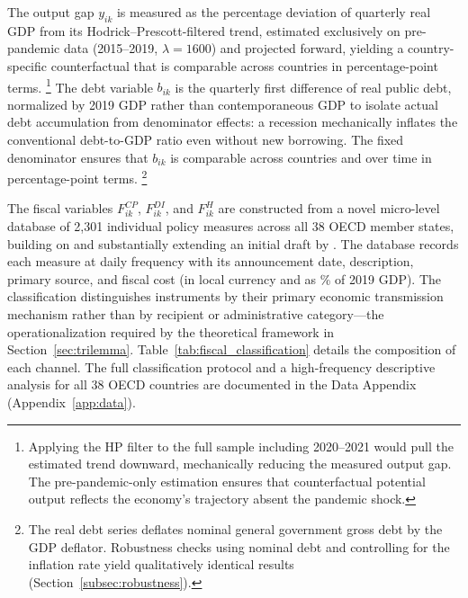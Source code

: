 \documentclass[12pt, a4paper]{article}
\begin{document}
\noindent The output gap $y_{ik}$ is measured as the percentage deviation of
quarterly real GDP from its Hodrick--Prescott-filtered trend, estimated
exclusively on pre-pandemic data (2015--2019, $\lambda = 1600$) and projected
forward, yielding a country-specific counterfactual that is comparable across
countries in percentage-point terms.%
\footnote{Applying the HP filter to the full sample including 2020--2021 would
pull the estimated trend downward, mechanically reducing the measured output gap.
The pre-pandemic-only estimation ensures that counterfactual potential output
reflects the economy's trajectory absent the pandemic shock.}
The debt variable $b_{ik}$ is the quarterly first difference of real public debt,
normalized by 2019 GDP rather than contemporaneous GDP to isolate actual debt
accumulation from denominator effects: a recession mechanically inflates the
conventional debt-to-GDP ratio even without new borrowing. The fixed denominator
ensures that $b_{ik}$ is comparable across countries and over time in
percentage-point terms.%
\footnote{The real debt series deflates nominal general government gross debt by
the GDP deflator. Robustness checks using nominal debt and controlling for the
inflation rate yield qualitatively identical results
(Section~\ref{subsec:robustness}).}

The fiscal variables $F_{ik}^{CP}$, $F_{ik}^{DI}$, and $F_{ik}^{H}$ are
constructed from a novel micro-level database of 2,301 individual policy measures
across all 38 OECD member states, building on and substantially extending an
initial draft by \citet{lacey2021}. The database records each measure at daily
frequency with its announcement date, description, primary source, and fiscal
cost (in local currency and as \% of 2019 GDP). The classification distinguishes instruments by their primary economic transmission mechanism rather than by recipient or administrative category---the operationalization required by the theoretical framework in Section~\ref{sec:trilemma}. Table~\ref{tab:fiscal_classification} details the composition of each channel. The full classification protocol and a
high-frequency descriptive analysis for all 38 OECD countries are documented in
the Data Appendix (Appendix~\ref{app:data}).
\end{document}
